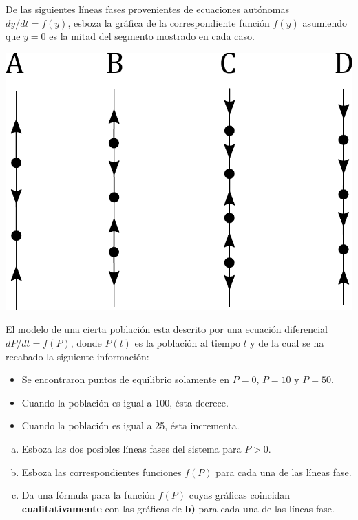 \documentclass[12pt]{exam}
\begin{document}
\begin{questions}
     \question
     De las siguientes líneas fases provenientes de ecuaciones autónomas $dy/dt=f(y)$, esboza la gráfica de la correspondiente función $f(y)$ asumiendo que $y=0$ es la mitad del segmento mostrado en cada caso.
     
     \begin{center}
     \includegraphics[scale=0.8]{F3T1.pdf}    
     \end{center}
     
     \question
     El modelo de una cierta población esta descrito por una ecuación diferencial $dP/dt=f(P)$, donde $P(t)$ es la población al tiempo $t$ y de la cual se ha recabado la siguiente información:
     
     \begin{itemize}
         \item Se encontraron puntos de equilibrio solamente en $P=0$, $P=10$ y $P=50$.
         \item Cuando la población es igual a 100, ésta decrece.
         \item Cuando la población es igual a 25, ésta incrementa.
     \end{itemize}
     
     \begin{enumerate}[a)]
         \item Esboza las dos posibles líneas fases del sistema para $P>0$.
         \item Esboza las correspondientes funciones $f(P)$ para cada una de las líneas fase.
         \item Da una fórmula para la función $f(P)$ cuyas gráficas coincidan \textbf{cualitativamente} con las gráficas de \textbf{b)} para cada una de las líneas fase.
     \end{enumerate}



\end{questions}
\end{document}

